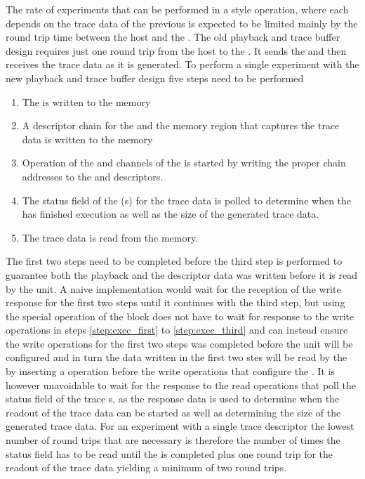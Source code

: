 The rate of experiments that can be performed in a \HWinTheLoop{} style operation, where each \PlaybackProgram{} depends on the trace data of the previous \PlaybackProgram{} is expected to be limited mainly by the round trip time between the host and the \FPGA{}. The old playback and trace buffer design requires just one round trip from the host to the \FPGA{}. It sends the \PlaybackProgram{} and then receives the trace data as it is generated.
To perform a single experiment with the new playback and trace buffer design five steps need to be performed
\begin{enumerate}
    \item\label{step:exec_first} The \PlaybackProgram{} is written to the \DDR{} memory
    \item A descriptor{} chain for the \PlaybackProgram{} and the memory region that captures the trace data is written to the \descriptor{} memory
    \item\label{step:exec_third} Operation of the \SToMM{} and \MMToS{} channels of the \AXIDMA{} is started by writing the proper \descriptor{} chain addresses to the \curdesc{} and \taildesc{} descriptors.
    \item The status field of the \descriptor{}(s) for the trace data is polled to determine when the \PlaybackProgram{} has finished execution as well as the size of the generated trace data.
    \item The trace data is read from the \DDR{} memory.
\end{enumerate}
The first two steps need to be completed before the third step is performed to guarantee both the playback and the descriptor data was written before it is read by the \AXIDMA{} unit.
A naive implementation would wait for the reception of the write response for the first two steps until it continues with the third step, but using the special \globalfence{} operation of the \FAXI{} block \ayo{} does not have to wait for response to the write operations in steps \autoref{step:exec_first} to \autoref{step:exec_third} and can instead ensure the write operations for the first two steps was completed before the \AXIDMA{} unit will be configured and in turn the data written in the first two stes will be read by the \AXIDMA{} by inserting a \globalfence{} operation before the write operations that configure the \AXIDMA{}. It is however unavoidable to wait for the response to the read operations that poll the status field of the trace \descriptor{}s, as the response data is used to determine when the readout of the trace data can be started as well as determining the size of the generated trace data. For an experiment with a single trace descriptor the lowest number of round trips that are necessary is therefore the number of times the status field has to be read until the \PlaybackProgram{} is completed plus one round trip for the readout of the trace data yielding a minimum of two round trips.
